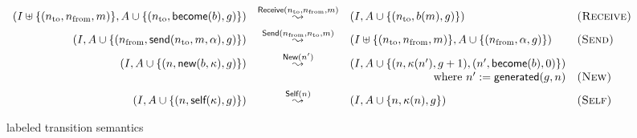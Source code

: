 \begin{figure*}[t]
  \begin{displaymath}
    \begin{array}{rcll}
      (I \uplus \{(n_{\textrm{to}}, n_{\textrm{from}}, m)\}, A \cup \{(n_{\textrm{to}}, \textsf{become}(b), g)\}) &
      \overset{\textsf{Receive}(n_{\textrm{to}}, n_{\textrm{from}}, m)}{\leadsto} &
      (I, A \cup \{(n_{\textrm{to}}, b(m), g)\}) &
      \textsc{(Receive)} \\[1ex]

      (I, A \cup \{(n_{\textrm{from}}, \textsf{send}(n_{\textrm{to}}, m, \alpha), g)\}) &
      \overset{\textsf{Send}(n_{\textrm{from}}, n_{\textrm{to}}, m)}{\leadsto} &
      (I \uplus \{(n_{\textrm{to}}, n_{\textrm{from}}, m)\}, A \cup \{(n_{\textrm{from}}, \alpha, g)\}) &
      \textsc{(Send)} \\[1ex]

      (I, A \cup \{(n, \textsf{new}(b, \kappa), g)\}) &
      \overset{\textsf{New}(n')}{\leadsto} &
      (I, A \cup \{(n, \kappa(n'), g + 1), (n', \textsf{become}(b), 0)\}) & \\
      & & \hfill \textrm{where}\ n' := \textsf{generated}(g, n) &
      \textsc{(New)} \\[1ex]

      (I, A \cup \{(n, \textsf{self}(\kappa), g)\}) &
      \overset{\textsf{Self}(n)}{\leadsto} &
      (I, A \cup \{n, \kappa(n), g\}) &
      \textsc{(Self)}
    \end{array}
  \end{displaymath}
  \caption{labeled transition semantics}\label{fig:semantics}
\end{figure*}

